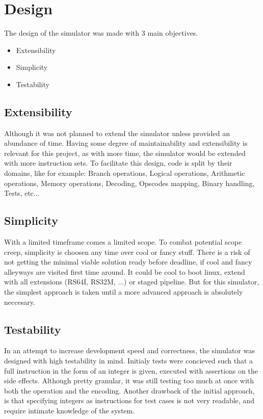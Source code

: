 \section*{Design}
The design of the simulator was made with 3 main objectives.
\begin{itemize}
    \item Extensibility
    \item Simplicity
    \item Testability
\end{itemize}


\subsection*{Extensibility}
Although it was not planned to extend the simulator unless provided an abundance of time.
Having some degree of maintainability and extensibility is relevant for this project, as with more time, the simulator would be extended with more instruction sets.
To facilitate this design, code is split by their domains, like for example: 
Branch operations, Logical operations, Arithmetic operations, Memory operations, Decoding, Opscodes mapping, Binary handling, Tests, etc...

\subsection*{Simplicity}
With a limited timeframe comes a limited scope. To combat potential scope creep, simplicity is choosen any time over cool or fancy stuff.
There is a risk of not getting the minimal viable solution ready before deadline, if cool and fancy alleyways are visited first time around.
It could be cool to boot linux, extend with all extensions (RS64I, RS32M, ...) or staged pipeline.
But for this simulator, the simplest approach is taken until a more advanced approach is absolutely neccesary.

\subsection*{Testability}
In an attempt to increase development speed and correctness, the simulator was designed with high testability in mind.
Initialy tests were concieved such that a full instruction in the form of an integer is given, executed with assertions on the side effects.
Although pretty granular, it was still testing too much at once with both the operation and the encoding.
Another drawback of the initial approach, is that specifying integers as instructions for test cases is not very readable, and require intimate knowledge of the system.

